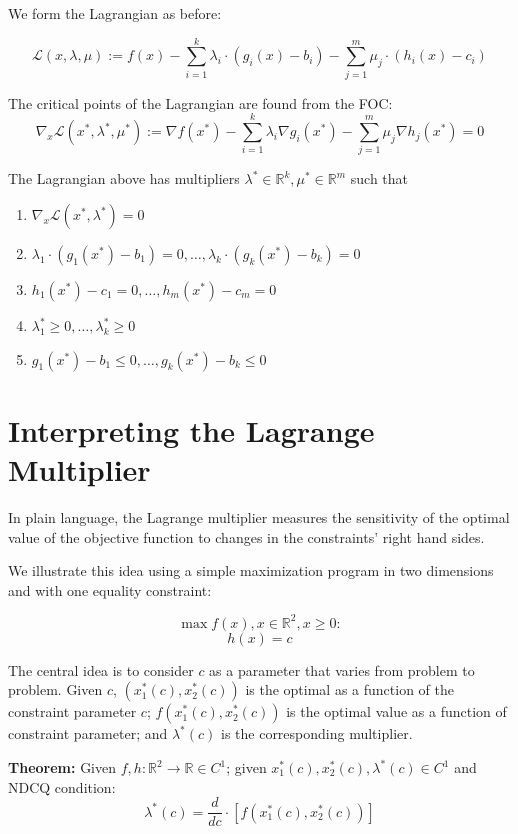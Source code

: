 \documentclass[11pt,]{article}
\providecommand{\tightlist}{%
  \setlength{\itemsep}{0pt}\setlength{\parskip}{0pt}}
\begin{document}
We form the Lagrangian as before:

\[
\mathcal{L}(x,\lambda,\mu) := f(x)-\sum_{i=1}^k \lambda_i\cdot(g_i(x)-b_i)-
\sum_{j=1}^m \mu_j\cdot(h_i(x)-c_i)
\]

The critical points of the Lagrangian are found from the FOC: \[
\nabla_x\mathcal{L}(x^*,\lambda^*,\mu^*) := \nabla f(x^*)-
\sum_{i=1}^k\lambda_i\nabla g_i(x^*) -
\sum_{j=1}^m\mu_j\nabla h_j(x^*)=0
\]

The Lagrangian above has multipliers
\(\lambda^*\in \mathbb{R}^k, \mu^*\in \mathbb{R}^m\) such that

\begin{enumerate}
\def\labelenumi{\arabic{enumi}.}
\tightlist
\item
  \(\nabla_x\mathcal{L}(x^*,\lambda^*)=0\)
\item
  \(\lambda_1\cdot(g_1(x^*)-b_1)=0,\hdots,\lambda_k\cdot(g_k(x^*)-b_k)=0\)
\item
  \(h_1(x^*)-c_1=0,\hdots,h_m(x^*)-c_m=0\)
\item
  \(\lambda_1^*\geq 0,\hdots,\lambda_k^*\geq 0\)
\item
  \(g_1(x^*)-b_1\leq 0,\hdots,g_k(x^*)-b_k\leq 0\)
\end{enumerate}

\section{Interpreting the Lagrange
Multiplier}\label{interpreting-the-lagrange-multiplier}

In plain language, the Lagrange multiplier measures the sensitivity of
the optimal value of the objective function to changes in the
constraints' right hand sides.

We illustrate this idea using a simple maximization program in two
dimensions and with one equality constraint:

\[\max f(x),x\in \mathbb{R}^2,x\geq 0:\] \[h(x)=c\]

The central idea is to consider \(c\) as a parameter that varies from
problem to problem. Given \(c\), \((x_1^*(c),x_2^*(c))\) is the optimal
as a function of the constraint parameter \(c\);
\(f(x_1^*(c),x_2^*(c))\) is the optimal value as a function of
constraint parameter; and \(\lambda^*(c)\) is the corresponding
multiplier.

\textbf{Theorem:} Given \(f,h:\mathbb{R}^2\to \mathbb{R}\in C^1\); given
\(x_1^*(c),x_2^*(c),\lambda^*(c)\in C^1\) and NDCQ condition:
\[\lambda^*(c)=\frac{d}{dc}\cdot [f(x_1^*(c),x_2^*(c))]\]
\end{document}
